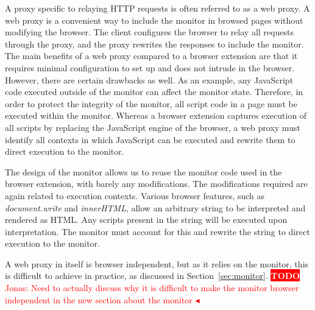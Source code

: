 \documentclass{llncs}
\newcommand{\todo}[1]{\colorbox{red}{\textcolor{white}{\sffamily\bfseries\scriptsize TODO}} \textcolor{red}{#1} \textcolor{red}{$\blacktriangleleft$}}
\begin{document}
A proxy specific to relaying HTTP requests is often referred to as a web proxy.
A web proxy is a convenient way to include the monitor in browsed pages without 
modifying the browser. The client configures the browser to relay 
all requests through the proxy, and the proxy rewrites the responses to include 
the monitor. The main benefits of a web proxy compared to a browser 
extension are that it requires 
minimal configuration to set up and does not intrude in the browser. However, there 
are certain drawbacks as well. 
%
As an example, any JavaScript code executed outside of the monitor can affect 
the monitor state. Therefore, in order to protect the integrity of the monitor, all 
script code in a page must be executed within the monitor. Whereas a 
browser extension captures execution of all scripts by replacing the JavaScript 
engine of the browser, a web proxy must identify all contexts in which JavaScript 
can be executed and rewrite them to direct execution to the monitor.

The design of the monitor allows us to reuse the monitor code used in the 
browser extension, with barely any modifications. The modifications required 
are again related to execution contexts. Various browser features, such as 
\emph{document.write} and \emph{innerHTML}, allow an arbitrary string to be 
interpreted and rendered as HTML. Any scripts present in the string will be 
executed upon interpretation. The monitor must account for this and rewrite 
the string to direct execution to the monitor.

A web proxy in itself is browser independent, but as it relies on the monitor, 
this is difficult to achieve in practice, as discussed in Section~\ref{sec:monitor}.
\todo{Jonas: Need to actually discuss why it is difficult to make the monitor browser independent in the new section about the monitor}
\end{document}
